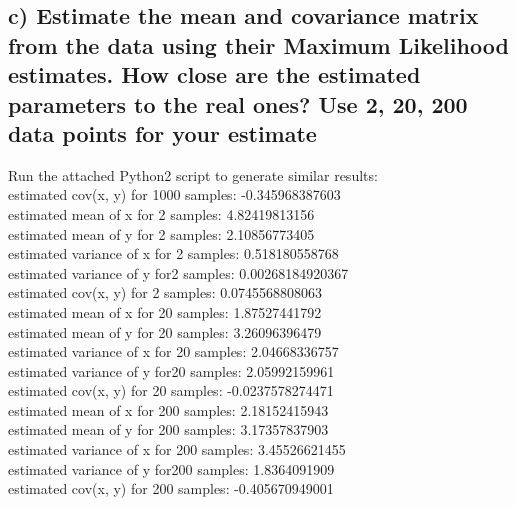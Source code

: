 \documentclass[11pt]{scrartcl} %
\begin{document}
         \subsection*{c) Estimate the mean and covariance matrix from the data using their Maximum Likelihood estimates. How close are the estimated parameters to the real ones? Use 2, 20, 200 data points for your estimate}
         Run the attached Python2 script to generate similar results:\\[2mm]
         estimated cov(x, y) for 1000 samples: -0.345968387603\\[2mm]
         estimated mean of x for 2 samples: 4.82419813156\\
         estimated mean of y for 2 samples: 2.10856773405\\
         estimated variance of x for 2 samples: 0.518180558768\\
         estimated variance of y for2 samples: 0.00268184920367\\
         estimated cov(x, y) for 2 samples: 0.0745568808063\\[2mm]
         estimated mean of x for 20 samples: 1.87527441792\\
         estimated mean of y for 20 samples: 3.26096396479\\
         estimated variance of x for 20 samples: 2.04668336757\\
         estimated variance of y for20 samples: 2.05992159961\\
         estimated cov(x, y) for 20 samples: -0.0237578274471\\[2mm]
         estimated mean of x for 200 samples: 2.18152415943\\
         estimated mean of y for 200 samples: 3.17357837903\\
         estimated variance of x for 200 samples: 3.45526621455\\
         estimated variance of y for200 samples: 1.8364091909\\
         estimated cov(x, y) for 200 samples: -0.405670949001\\

         
\end{document}
